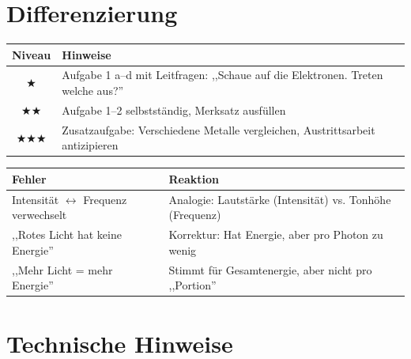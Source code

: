 \documentclass[11pt,a4paper]{article}
\begin{document}
\vspace{1em}


\section*{Differenzierung}

\begin{tabularx}{\textwidth}{|c|X|}
\hline
\rowcolor{physiklight}
\textbf{Niveau} & \textbf{Hinweise} \\
\hline
★ & Aufgabe 1 a--d mit Leitfragen: ,,Schaue auf die Elektronen. Treten welche aus?'' \\
\hline
★★ & Aufgabe 1--2 selbstständig, Merksatz ausfüllen \\
\hline
★★★ & Zusatzaufgabe: Verschiedene Metalle vergleichen, Austrittsarbeit antizipieren \\
\hline
\end{tabularx}

\vspace{1em}


\begin{tcolorbox}[warnbox={Häufige Schülerfehler}]
\begin{tabularx}{\textwidth}{lX}
\textbf{Fehler} & \textbf{Reaktion} \\
\hline
Intensität $\leftrightarrow$ Frequenz verwechselt & Analogie: Lautstärke (Intensität) vs. Tonhöhe (Frequenz) \\
\hline
,,Rotes Licht hat keine Energie'' & Korrektur: Hat Energie, aber pro Photon zu wenig \\
\hline
,,Mehr Licht = mehr Energie'' & Stimmt für Gesamtenergie, aber nicht pro ,,Portion'' \\
\hline
\end{tabularx}
\end{tcolorbox}

\vspace{1em}


\section*{Technische Hinweise}
\end{document}
